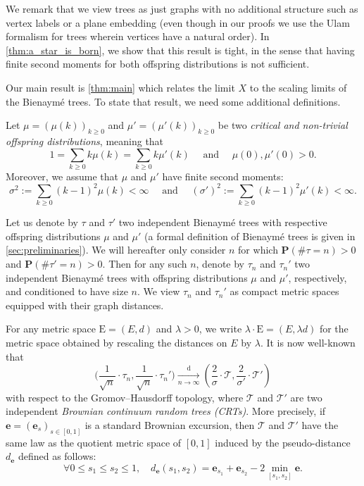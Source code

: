 \documentclass[11pt,reqno]{amsart}
\renewcommand{\P}{\mathbf{P}}
\newcommand{\1}{\mathbf{1}}
\newcommand{\0}{\mathbf{0}}
\newcommand{\be}{\mathbf{e}}
\newcommand{\rE}{\mathrm{E}}
\newcommand{\sT}{\mathscr{T}}
\begin{document}
We remark that we view trees as just graphs with no additional structure such as vertex labels or a plane embedding (even though in our proofs we use the Ulam formalism for trees wherein vertices have a natural order).
In \cref{thm:a_star_is_born}, we show that this result is tight, in the sense that having finite second moments for both offspring distributions is not sufficient. 

Our main result is \cref{thm:main} which relates the limit $X$ to the scaling limits of the Bienaym\'e trees.
To state that result, we need some additional definitions.
\smallskip

Let $\mu=(\mu(k))_{k\geq 0}$ and $\mu'=(\mu'(k))_{k\geq 0}$ be two \emph{critical and non-trivial offspring distributions}, meaning that
\begin{equation}
\label{criticality_assumption}
1=\sum_{k\geq 0}k\mu(k)=\sum_{k\geq 0}k\mu'(k)\quad\text{ and }\quad \mu(0),\mu'(0)>0.
\end{equation}
Moreover, we assume that $\mu$ and $\mu'$ have finite second moments:
\begin{equation}
\label{finite_2-moment_assumption}
\sigma^2:=\sum_{k\geq 0}(k-1)^2\mu(k)<\infty\quad\text{ and }\quad (\sigma')^2:=\sum_{k\geq 0}(k-1)^2\mu'(k)<\infty.
\end{equation}

Let us denote by $\tau$ and $\tau'$ two independent Bienaymé trees with respective offspring distributions $\mu$ and $\mu'$ (a formal definition of Bienaym\'{e} trees is given in \cref{sec:preliminaries}). 
We will hereafter only consider $n$ for which $\P(\# \tau=n)>0$ and $\P(\# \tau'=n)>0$. Then for any such $n$, denote by $\tau_n$ and $\tau_n'$ two independent Bienaymé trees with offspring distributions $\mu$ and $\mu'$, respectively, and conditioned to have size $n$. We view $\tau_n$ and $\tau_n'$ as compact metric spaces equipped with their graph distances.

For any metric space $\rE=(E,d)$ and $\lambda>0$, we write $\lambda\cdot \rE=(E,\lambda d)$ for the metric space obtained by rescaling the distances on $E$ by $\lambda$. It is now well-known \cite{aldous1993continuumIII,haas2012scaling} that 
\begin{equation}
\label{Bienayme->CRT}
\bigg(\frac{1}{\sqrt{n}}\cdot\tau_n,\frac{1}{\sqrt{n}}\cdot\tau_n'\bigg)\xrightarrow[n\to\infty]{\mathrm d}\left(\frac{2}{\sigma}\cdot \sT,\frac{2}{\sigma'}\cdot \sT'\right)
\end{equation}
with respect to the Gromov--Hausdorff topology, where $\sT$ and $\sT'$ are two independent \emph{Brownian continuum random trees (CRTs)}. More precisely, if $\be=(\be_s)_{s\in[0,1]}$ is a standard Brownian excursion, then $\sT$ and $\sT'$ have the same law as the quotient metric space of $[0,1]$ induced by the pseudo-distance $d_{\be}$ defined as follows:
\[\forall 0\leq s_1\leq s_2\leq 1,\quad d_{\be}(s_1,s_2)=\be_{s_1}+\be_{s_2}-2\min_{[s_1,s_2]}\be.\]
\end{document}
